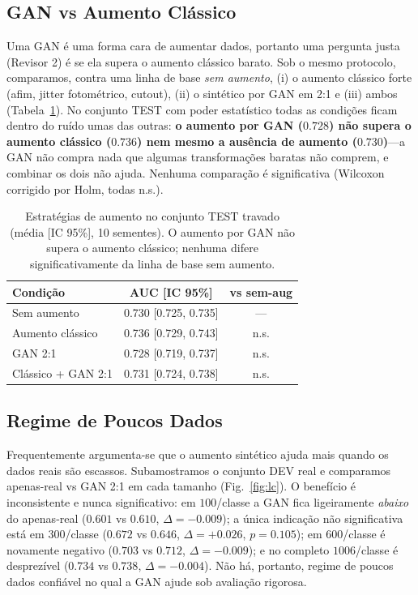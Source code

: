 \documentclass[runningheads]{llncs}
\begin{document}
\subsection{GAN vs Aumento Clássico}
Uma GAN é uma forma cara de aumentar dados, portanto uma pergunta justa (Revisor
2) é se ela supera o aumento clássico barato. Sob o mesmo protocolo, comparamos,
contra uma linha de base \emph{sem aumento}, (i) o aumento clássico forte (afim,
jitter fotométrico, cutout), (ii) o sintético por GAN em 2:1 e (iii) ambos
(Tabela~\ref{tab:augcompare}). No conjunto TEST com poder estatístico todas as
condições ficam dentro do ruído umas das outras: \textbf{o aumento por GAN
($0.728$) não supera o aumento clássico ($0.736$) nem mesmo a ausência de aumento
($0.730$)}---a GAN não compra nada que algumas transformações baratas não
comprem, e combinar os dois não ajuda. Nenhuma comparação é significativa
(Wilcoxon corrigido por Holm, todas n.s.).

\begin{table}[t]
\centering
\caption{Estratégias de aumento no conjunto TEST travado (média [IC 95\%], 10
sementes). O aumento por GAN não supera o aumento clássico; nenhuma difere
significativamente da linha de base sem aumento.}
\label{tab:augcompare}
\begin{tabular}{lcc}
\toprule
Condição & AUC [IC 95\%] & vs sem-aug \\
\midrule
Sem aumento & 0.730 [0.725, 0.735] & --- \\
Aumento clássico & 0.736 [0.729, 0.743] & n.s. \\
GAN 2:1 & 0.728 [0.719, 0.737] & n.s. \\
Clássico + GAN 2:1 & 0.731 [0.724, 0.738] & n.s. \\
\bottomrule
\end{tabular}
\end{table}

\subsection{Regime de Poucos Dados}
Frequentemente argumenta-se que o aumento sintético ajuda mais quando os dados
reais são escassos. Subamostramos o conjunto DEV real e comparamos apenas-real
vs GAN 2:1 em cada tamanho (Fig.~\ref{fig:lc}). O benefício é inconsistente e
nunca significativo: em $100$/classe a GAN fica ligeiramente \emph{abaixo} do
apenas-real ($0.601$ vs $0.610$, $\Delta{=}-0.009$); a única indicação não
significativa está em $300$/classe ($0.672$ vs $0.646$, $\Delta{=}+0.026$,
$p{=}0.105$); em $600$/classe é novamente negativo ($0.703$ vs $0.712$,
$\Delta{=}-0.009$); e no completo $1006$/classe é desprezível ($0.734$ vs
$0.738$, $\Delta{=}-0.004$). Não há, portanto, regime de poucos dados confiável no
qual a GAN ajude sob avaliação rigorosa.
\end{document}
